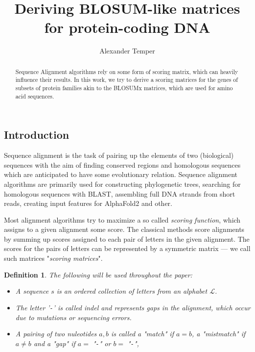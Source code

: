 \documentclass{article}
\title{Deriving BLOSUM-like matrices for protein-coding DNA}
\author{Alexander Temper}
\newtheorem{definition}{Definition}
\begin{document}
\maketitle

\begin{abstract}
    Sequence Alignment algorithms rely on some form of scoring matrix,
    which can heavily influence their results. In this work, we try to derive a
    scoring matrices for the genes of subsets of protein families akin to
    the BLOSUMx matrices, which are used for amino acid sequences.
\end{abstract}

\begin{multicols}{2}
	
\section*{Introduction} Sequence alignment is the task of pairing up the
elements of two (biological) sequences with the aim of finding conserved
regions and homologous sequences which are anticipated to have some
evolutionary relation. Sequence alignment algorithms are primarily used for
constructing phylogenetic trees, searching for homologous sequences with BLAST,
assembling full DNA strands from short reads, creating input features for
AlphaFold2 and other.

Most alignment algorithms try to maximize a so called \emph{scoring function},
which assigns to a given alignment some score. The classical methods score
alignments by summing up scores assigned to each pair of letters in the given
alignment. The scores for the pairs of letters can be represented by a
symmetric matrix --- we call such matrices "\emph{scoring matrices}".

\begin{definition}
    The following will be used throughout the paper:
    \begin{itemize}
        \item A \emph{sequence} $s$ is an ordered collection of letters from
              an alphabet $\mathcal{L}$.
        \item The letter '\texttt{-}' is called \emph{indel} and represents
              gaps in the alignment, which occur due to mutations or sequencing
              errors.
      \item A pairing of two nuleotides $a, b$ is called a "\emph{match}" if $a = b$, a "\emph{mistmatch"} if $a \ne b$ and a "\emph {gap}" if $a =$ "\texttt{-}" or $b =$ "\texttt{-}",


\end{itemize}
\end{definition}
\end{multicols}
\end{document}
